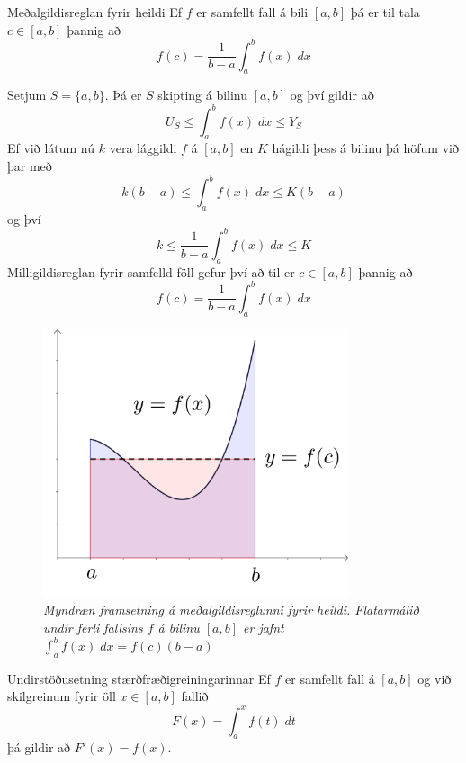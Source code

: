 \begin{regla}{Meðalgildisreglan fyrir heildi}
Ef $f$ er samfellt fall á bili $[a,b]$ þá er til tala $c \in [a,b]$ þannig að
$$
f(c) = \frac{1}{b-a}\int_{a}^{b} f(x) \; dx
$$
\end{regla}

\begin{sonnun}
Setjum $S = \{a,b\}$. Þá er $S$ skipting á bilinu $[a,b]$ og því gildir að
$$
U_{S} \leq \int_{a}^{b} f(x) \; dx \leq Y_{S}
$$
Ef við látum nú $k$ vera lággildi $f$ á $[a,b]$ en $K$ hágildi þess á bilinu þá höfum við þar með
$$
k(b-a) \leq \int_{a}^{b} f(x) \; dx \leq K(b-a)
$$
og því
$$
k \leq \frac{1}{b-a}\int_{a}^{b} f(x) \; dx \leq K
$$
Milligildisreglan fyrir samfelld föll gefur því að til er $c \in [a,b]$ þannig að
$$
f(c) = \frac{1}{b-a}\int_{a}^{b} f(x) \; dx
$$

\begin{figure}[H]
\center
\includegraphics[width=0.8\textwidth]{Pictures/k2m10.png}
\caption{\it Myndræn framsetning á meðalgildisreglunni fyrir heildi. Flatarmálið undir ferli fallsins $f$ á bilinu $[a,b]$ er jafnt $\displaystyle \int_{a}^{b} f(x)\;dx = f(c)(b-a)$}
\end{figure}

\end{sonnun}

\begin{regla}{Undirstöðusetning stærðfræðigreiningarinnar} 
Ef $f$ er samfellt fall á $[a,b]$ og við skilgreinum fyrir öll $x \in [a,b]$ fallið
$$
F(x) = \int_{a}^{x} f(t)\;dt
$$
þá gildir að $F'(x) = f(x)$.
\end{regla}

